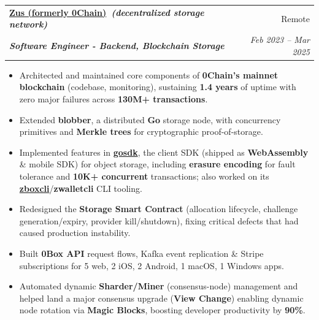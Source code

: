 \documentclass[letterpaper,10pt]{article}
\makeatletter
\newcommand{\resumeItem}[1]{
  \item\small{
    #1 \vspace{-3pt}
  }
}
\newcommand{\resumeSubheading}[4]{
  \item[]
    \begin{tabular*}{0.97\textwidth}{l@{\extracolsep{\fill}}r}
      \textbf{#1} & #2 \\
      \textit{\small#3} & \textit{\small #4} \\
    \end{tabular*}
}
\newcommand{\resumeItemListStart}{\vspace{-2pt}\begin{itemize}[leftmargin=8pt,itemsep=1.5pt,parsep=0pt]
  \selectfont\small
  \setlength\itemsep{1.5pt}
  \setlength\parsep{0em}
  }
\newcommand{\resumeItemListEnd}{\end{itemize}}
\makeatother
\begin{document}
\resumeSubheading
{\href{https://0chain.net}{Zus (formerly 0Chain)}{\normalfont\itshape\small\ (decentralized storage network)}}{Remote}
{\textbf{Software Engineer - Backend, Blockchain Storage}}{Feb 2023 -- Mar 2025}
\resumeItemListStart
\resumeItem{Architected and maintained core components of \textbf{0Chain's mainnet blockchain} (codebase, monitoring), sustaining \textbf{1.4 years} of uptime with zero major failures across \textbf{130M+ transactions}.}
\resumeItem{Extended \textbf{blobber}, a distributed \textbf{Go} storage node, with concurrency primitives and \textbf{Merkle trees} for cryptographic proof-of-storage.}
\resumeItem{Implemented features in \href{https://github.com/0chain/gosdk/pulls?q=is:pr+is:merged+author:yash10019coder}{\textbf{gosdk}}, the client SDK (shipped as \textbf{WebAssembly} \& mobile SDK) for object storage, including \textbf{erasure encoding} for fault tolerance and \textbf{10K+ concurrent} transactions; also worked on its \href{https://github.com/0chain/zboxcli/pulls?q=is:pr+is:merged+author:yash10019coder}{\textbf{zboxcli}}/\textbf{zwalletcli} CLI tooling.}
\resumeItem{Redesigned the \textbf{Storage Smart Contract} (allocation lifecycle, challenge generation/expiry, provider kill/shutdown), fixing critical defects that had caused production instability.}
\resumeItem{Built \textbf{0Box API} request flows, Kafka event replication \& Stripe subscriptions for 5 web, 2 iOS, 2 Android, 1 macOS, 1 Windows apps.}
\resumeItem{Automated dynamic \textbf{Sharder/Miner} (consensus-node) management and helped land a major consensus upgrade (\textbf{View Change}) enabling dynamic node rotation via \textbf{Magic Blocks}, boosting developer productivity by \textbf{90\%}.}
\resumeItemListEnd
\end{document}

